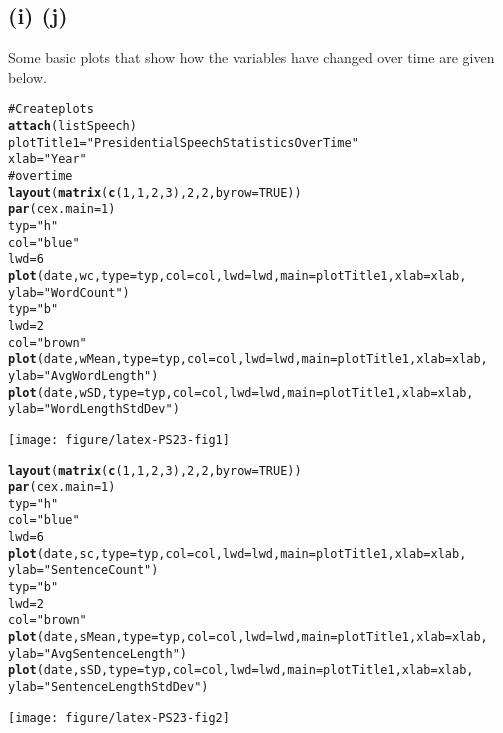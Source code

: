 \documentclass{article}\usepackage{graphicx, color}
\makeatletter
\newcommand{\hlfunctioncall}[1]{\textcolor[rgb]{0.501960784313725,0,0.329411764705882}{\textbf{#1}}}%
\newcommand{\hlstring}[1]{\textcolor[rgb]{0.6,0.6,1}{#1}}%
\newcommand{\hlcomment}[1]{\textcolor[rgb]{0.180392156862745,0.6,0.341176470588235}{#1}}%
\newenvironment{kframe}{%
 \def\at@end@of@kframe{}%
 \ifinner\ifhmode%
  \def\at@end@of@kframe{\end{minipage}}%
  \begin{minipage}{\columnwidth}%
 \fi\fi%
 \def\FrameCommand##1{\hskip\@totalleftmargin \hskip-\fboxsep
 \colorbox{shadecolor}{##1}\hskip-\fboxsep
     \hskip-\linewidth \hskip-\@totalleftmargin \hskip\columnwidth}%
 \MakeFramed {\advance\hsize-\width
   \@totalleftmargin\z@ \linewidth\hsize
   \@setminipage}}%
 {\par\unskip\endMakeFramed%
 \at@end@of@kframe}
\newenvironment{knitrout}{}{} %
\makeatother
\begin{document}
\subsection*{(i) (j)}

Some basic plots that show how the variables have changed over time are given below.





\begin{knitrout}
\color{fgcolor}\begin{kframe}
\begin{alltt}
\hlcomment{# Create plots}
\hlfunctioncall{attach}(listSpeech)
plotTitle1 = \hlstring{"Presidential Speech Statistics Over Time"}
xlab = \hlstring{"Year"}
\hlcomment{# over time}
\hlfunctioncall{layout}(\hlfunctioncall{matrix}(\hlfunctioncall{c}(1, 1, 2, 3), 2, 2, byrow = TRUE))
\hlfunctioncall{par}(cex.main = 1)
typ = \hlstring{"h"}
col = \hlstring{"blue"}
lwd = 6
\hlfunctioncall{plot}(date, wc, type = typ, col = col, lwd = lwd, main = plotTitle1, xlab = xlab, 
    ylab = \hlstring{"Word Count"})
typ = \hlstring{"b"}
lwd = 2
col = \hlstring{"brown"}
\hlfunctioncall{plot}(date, wMean, type = typ, col = col, lwd = lwd, main = plotTitle1, xlab = xlab, 
    ylab = \hlstring{"Avg Word Length"})
\hlfunctioncall{plot}(date, wSD, type = typ, col = col, lwd = lwd, main = plotTitle1, xlab = xlab, 
    ylab = \hlstring{"Word Length Std Dev"})
\end{alltt}
\end{kframe}\texttt{[image: figure/latex-PS23-fig1]} \begin{kframe}\begin{alltt}

\hlfunctioncall{layout}(\hlfunctioncall{matrix}(\hlfunctioncall{c}(1, 1, 2, 3), 2, 2, byrow = TRUE))
\hlfunctioncall{par}(cex.main = 1)
typ = \hlstring{"h"}
col = \hlstring{"blue"}
lwd = 6
\hlfunctioncall{plot}(date, sc, type = typ, col = col, lwd = lwd, main = plotTitle1, xlab = xlab, 
    ylab = \hlstring{"Sentence Count"})
typ = \hlstring{"b"}
lwd = 2
col = \hlstring{"brown"}
\hlfunctioncall{plot}(date, sMean, type = typ, col = col, lwd = lwd, main = plotTitle1, xlab = xlab, 
    ylab = \hlstring{"Avg Sentence Length"})
\hlfunctioncall{plot}(date, sSD, type = typ, col = col, lwd = lwd, main = plotTitle1, xlab = xlab, 
    ylab = \hlstring{"Sentence Length Std Dev"})
\end{alltt}
\end{kframe}\texttt{[image: figure/latex-PS23-fig2]} \begin{kframe}\begin{alltt}


\end{alltt}
\end{kframe}
\end{knitrout}
\end{document}

